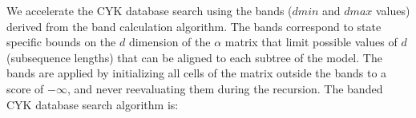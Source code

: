 \documentclass[11pt]{article}
\begin{document}

We accelerate the CYK database search using the bands ($dmin$ and $dmax$
values) derived from the band calculation algorithm. The bands
correspond to state specific bounds on the $d$ dimension of the
$\alpha$ matrix that limit possible values of $d$ (subsequence
lengths) that can be aligned to each subtree of the model. The bands
are applied by initializing all cells of the matrix outside the bands
to a score of $-\infty$, and never
reevaluating them during the recursion. The banded CYK database search
algorithm is: 
\end{document}
